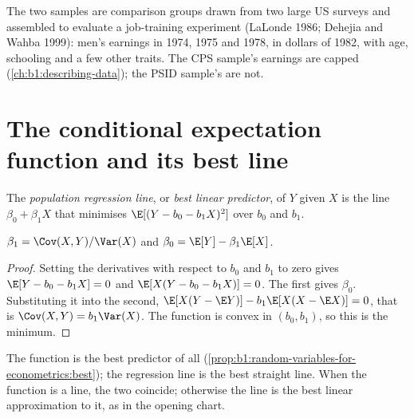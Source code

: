\begin{measure}
The two samples are comparison groups drawn from two large US surveys and
assembled to evaluate a job-training experiment (LaLonde 1986; Dehejia and
Wahba 1999): men's earnings in 1974, 1975 and 1978, in dollars of 1982, with
age, schooling and a few other traits. %
The CPS sample's earnings are capped (\cref{ch:b1:describing-data}); the PSID
sample's are not.
\end{measure}

\section{The conditional expectation function and its best line}\label{sec:b1:simple-regression:population}

\begin{definition}\label{def:b1:simple-regression:population-line}
The \emph{population regression line}, or \emph{best linear predictor}, of $Y$ given $X$ is
the line $\beta_0 + \beta_1 X$ that minimises $\E[(Y - b_0 - b_1X)^2]$ over $b_0$ and $b_1$.
\end{definition}

\begin{proposition}\label{prop:b1:simple-regression:population}
$\beta_1 = \Cov(X, Y)/\Var(X)$ and $\beta_0 = \E[Y] - \beta_1\E[X]$.
\end{proposition}

\begin{proof}
Setting the derivatives with respect to $b_0$ and $b_1$ to zero gives $\E[Y - b_0 - b_1X] = 0$
and $\E[X(Y - b_0 - b_1X)] = 0$. The first gives $\beta_0$. Substituting it into the second,
$\E[X(Y - \E Y)] - b_1\E[X(X - \E X)] = 0$, that is $\Cov(X, Y) = b_1\Var(X)$. The function is convex in
$(b_0, b_1)$, so this is the minimum.
\end{proof}

The  function is the best predictor of all
(\cref{prop:b1:random-variables-for-econometrics:best}); the regression line is the best straight line. When the
 function is a line, the two coincide; otherwise
the line is the best linear approximation to it, as in the opening chart.

